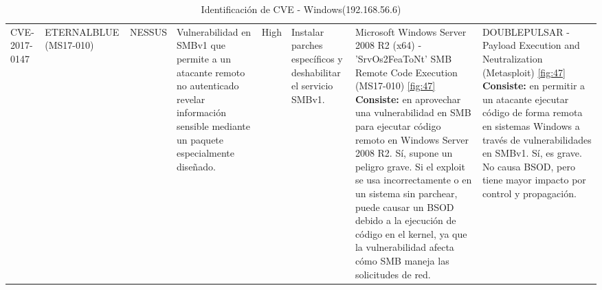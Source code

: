 \documentclass[a4paper,12pt]{article} %
\begin{document}
\begin{table}[hp!]
{\begin{tabular}{m{2.1cm}|m{2.6cm}|m{2cm}|m{4cm}|m{1cm}|m{3cm}|m{5cm}|m{5cm}}
  {CVE-2017-0147} & {ETERNALBLUE (MS17-010)} & {NESSUS} & {Vulnerabilidad en SMBv1 que permite a un atacante remoto no autenticado revelar información sensible mediante un paquete especialmente diseñado.} & {High} & {Instalar parches específicos y deshabilitar el servicio SMBv1.} & { Microsoft Windows Server 2008 R2 (x64) - 'SrvOs2FeaToNt' SMB Remote Code Execution (MS17-010) \ref{fig:47} \vspace{2mm} \hline \vspace{2mm} {\color{blue} \textbf{Consiste:} en aprovechar una vulnerabilidad en SMB para ejecutar código remoto en Windows Server 2008 R2.} \vspace{2mm} \hline \vspace{2mm} {\color{red} Sí, supone un peligro grave. Si el exploit se usa incorrectamente o en un sistema sin parchear, puede causar un BSOD debido a la ejecución de código en el kernel, ya que la vulnerabilidad afecta cómo SMB maneja las solicitudes de red.}} & {DOUBLEPULSAR - Payload Execution and Neutralization (Metasploit) \ref{fig:47}  \vspace{2mm} \hline \vspace{2mm} {\color{blue} \textbf{Consiste:} en permitir a un atacante ejecutar código de forma remota en sistemas Windows a través de vulnerabilidades en SMBv1.} \vspace{2mm} \hline \vspace{2mm} {\color{red} Sí, es grave. No causa BSOD, pero tiene mayor impacto por control y propagación.}}\\

  
  \end{tabular}}
  \caption{Identificación de CVE - Windows(192.168.56.6)}
  \label{tab:windows1}
\end{table}

\newpage
\end{document}
